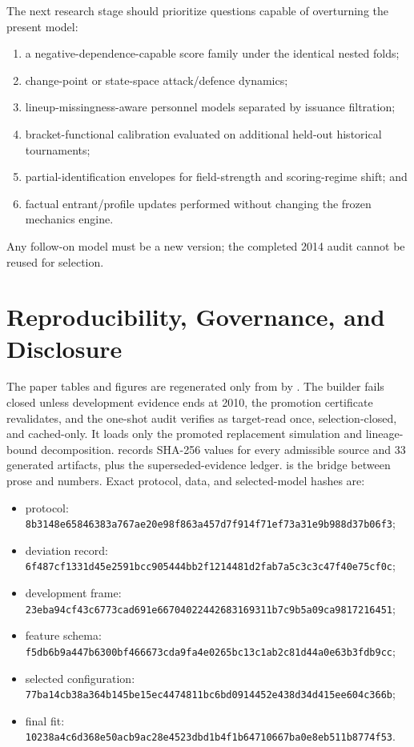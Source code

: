 \documentclass[11pt]{article}
\begin{document}
The next research stage should prioritize questions capable of overturning the present model:
\begin{enumerate}
  \item a negative-dependence-capable score family under the identical nested folds;
  \item change-point or state-space attack/defence dynamics;
  \item lineup-missingness-aware personnel models separated by issuance filtration;
  \item bracket-functional calibration evaluated on additional held-out historical tournaments;
  \item partial-identification envelopes for field-strength and scoring-regime shift; and
  \item factual entrant/profile updates performed without changing the frozen mechanics engine.
\end{enumerate}
Any follow-on model must be a new version; the completed 2014 audit cannot be reused for selection.

\section{Reproducibility, Governance, and Disclosure}

The paper tables and figures are regenerated only from  by
.  The builder fails closed unless development evidence ends
at 2010, the promotion certificate revalidates, and the one-shot audit verifies as target-read once,
selection-closed, and cached-only.  It loads only the promoted replacement simulation and
lineage-bound decomposition.   records SHA-256 values for every
admissible source and 33 generated artifacts, plus the superseded-evidence ledger.
 is the bridge between prose and numbers.  Exact protocol,
data, and selected-model hashes are:

\begin{itemize}
  \item protocol: \nolinkurl{8b3148e65846383a767ae20e98f863a457d7f914f71ef73a31e9b988d37b06f3};
  \item deviation record: \nolinkurl{6f487cf1331d45e2591bcc905444bb2f1214481d2fab7a5c3c3c47f40e75cf0c};
  \item development frame: \nolinkurl{23eba94cf43c6773cad691e66704022442683169311b7c9b5a09ca9817216451};
  \item feature schema: \nolinkurl{f5db6b9a447b6300bf466673cda9fa4e0265bc13c1ab2c81d44a0e63b3fdb9cc};
  \item selected configuration: \nolinkurl{77ba14cb38a364b145be15ec4474811bc6bd0914452e438d34d415ee604c366b};
  \item final fit: \nolinkurl{10238a4c6d368e50acb9ac28e4523dbd1b4f1b64710667ba0e8eb511b8774f53}.
\end{itemize}
\end{document}
